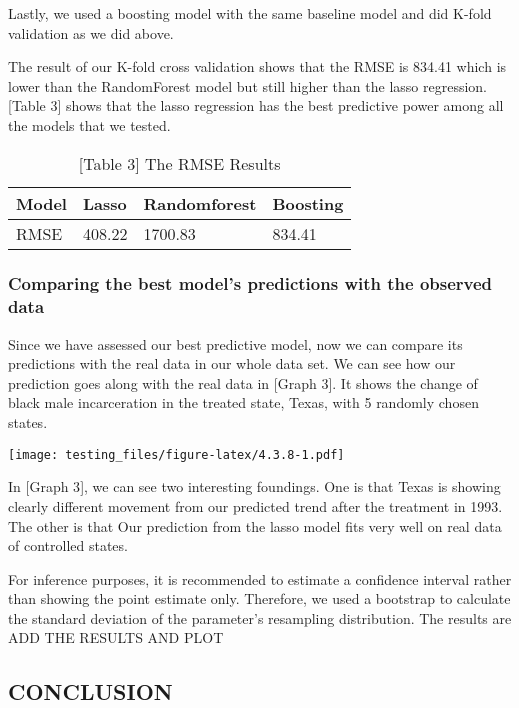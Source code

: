 \documentclass[
]{article}
\begin{document}
Lastly, we used a boosting model with the same baseline model and did
K-fold validation as we did above.

The result of our K-fold cross validation shows that the RMSE is 834.41
which is lower than the RandomForest model but still higher than the
lasso regression. {[}Table 3{]} shows that the lasso regression has the
best predictive power among all the models that we tested.

\begin{table}

\caption{\label{tab:4.3.7}[Table 3] The RMSE Results}
\centering
\begin{tabular}[t]{l|l|l|l}
\hline
Model & Lasso & Randomforest & Boosting\\
\hline
RMSE & 408.22 & 1700.83 & 834.41\\
\hline
\end{tabular}
\end{table}

\hypertarget{comparing-the-best-models-predictions-with-the-observed-data}{%
\subsubsection{Comparing the best model's predictions with the observed
data}\label{comparing-the-best-models-predictions-with-the-observed-data}}

Since we have assessed our best predictive model, now we can compare its
predictions with the real data in our whole data set. We can see how our
prediction goes along with the real data in {[}Graph 3{]}. It shows the
change of black male incarceration in the treated state, Texas, with 5
randomly chosen states.

\texttt{[image: testing\_files/figure-latex/4.3.8-1.pdf]}

In {[}Graph 3{]}, we can see two interesting foundings. One is that
Texas is showing clearly different movement from our predicted trend
after the treatment in 1993. The other is that Our prediction from the
lasso model fits very well on real data of controlled states.

For inference purposes, it is recommended to estimate a confidence
interval rather than showing the point estimate only. Therefore, we used
a bootstrap to calculate the standard deviation of the parameter's
resampling distribution. The results are ADD THE RESULTS AND PLOT

\hypertarget{conclusion}{%
\subsection{CONCLUSION}\label{conclusion}}
\end{document}
